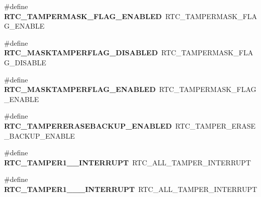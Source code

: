 \begin{DoxyCompactItemize}
\item 
\mbox{\label{group___h_a_l___r_t_c___aliased___defines_gac03d2b586cb1c5c471697b57864e7bc8}} 
\#define {\bfseries R\+T\+C\+\_\+\+T\+A\+M\+P\+E\+R\+M\+A\+S\+K\+\_\+\+F\+L\+A\+G\+\_\+\+E\+N\+A\+B\+L\+ED}~R\+T\+C\+\_\+\+T\+A\+M\+P\+E\+R\+M\+A\+S\+K\+\_\+\+F\+L\+A\+G\+\_\+\+E\+N\+A\+B\+LE
\item 
\mbox{\label{group___h_a_l___r_t_c___aliased___defines_ga968bde232135b78ff974d5523890860d}} 
\#define {\bfseries R\+T\+C\+\_\+\+M\+A\+S\+K\+T\+A\+M\+P\+E\+R\+F\+L\+A\+G\+\_\+\+D\+I\+S\+A\+B\+L\+ED}~R\+T\+C\+\_\+\+T\+A\+M\+P\+E\+R\+M\+A\+S\+K\+\_\+\+F\+L\+A\+G\+\_\+\+D\+I\+S\+A\+B\+LE
\item 
\mbox{\label{group___h_a_l___r_t_c___aliased___defines_gab9424e57ef6067b1d7f5030ee45192d5}} 
\#define {\bfseries R\+T\+C\+\_\+\+M\+A\+S\+K\+T\+A\+M\+P\+E\+R\+F\+L\+A\+G\+\_\+\+E\+N\+A\+B\+L\+ED}~R\+T\+C\+\_\+\+T\+A\+M\+P\+E\+R\+M\+A\+S\+K\+\_\+\+F\+L\+A\+G\+\_\+\+E\+N\+A\+B\+LE
\item 
\mbox{\label{group___h_a_l___r_t_c___aliased___defines_ga4a78a492baabe7132ddfcf94cf7805c0}} 
\#define {\bfseries R\+T\+C\+\_\+\+T\+A\+M\+P\+E\+R\+E\+R\+A\+S\+E\+B\+A\+C\+K\+U\+P\+\_\+\+E\+N\+A\+B\+L\+ED}~R\+T\+C\+\_\+\+T\+A\+M\+P\+E\+R\+\_\+\+E\+R\+A\+S\+E\+\_\+\+B\+A\+C\+K\+U\+P\+\_\+\+E\+N\+A\+B\+LE
\item 
\mbox{\label{group___h_a_l___r_t_c___aliased___defines_gad52c576aeb40eeeed3274e6a8c5cf83a}} 
\#define {\bfseries R\+T\+C\+\_\+\+T\+A\+M\+P\+E\+R1\+\_\+\_\+\+I\+N\+T\+E\+R\+R\+U\+PT}~R\+T\+C\+\_\+\+A\+L\+L\+\_\+\+T\+A\+M\+P\+E\+R\+\_\+\+I\+N\+T\+E\+R\+R\+U\+PT
\item 
\mbox{\label{group___h_a_l___r_t_c___aliased___defines_ga30a97d2cbfeca6b663b9f116e13c511a}} 
\#define {\bfseries R\+T\+C\+\_\+\+T\+A\+M\+P\+E\+R1\+\_\+\_\+\_\+\+I\+N\+T\+E\+R\+R\+U\+PT}~R\+T\+C\+\_\+\+A\+L\+L\+\_\+\+T\+A\+M\+P\+E\+R\+\_\+\+I\+N\+T\+E\+R\+R\+U\+PT
\item 
\mbox{\label{group___h_a_l___r_t_c___aliased___defines_ga86b6c9d9b06b1ab23722bf02799adfca}} 

\end{DoxyCompactItemize}
